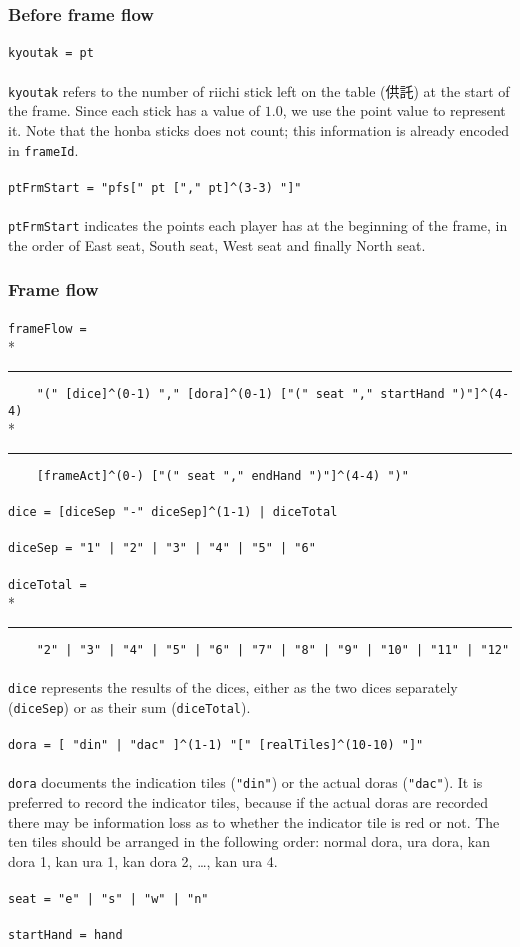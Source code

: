 \documentclass[%
	a4paper%
	,10pt%
	,twoside%
	,notitlepage%
]{article}%
\newcommand*{\ruleSymbol}{\textjapanese{⚠}}%
\newcommand*{\ruleMargin}{\marginpar{\flushright{}\ruleSymbol{}}}%
\newcommand*{\rulePar}{\paragraph*{\ruleMargin{}}}%
\newcommand*{\indentRule}{\rule{10pt}{0pt}}%
\begin{document}
		\subsubsection{Before frame flow}\label{subsubsec:prefrmflow}%
			\rulePar{}\lstinline/kyoutak = pt/%
			\paragraph*{}\lstinline/kyoutak/ refers to the number of riichi stick left on the table (\textjapanese{供託}) at the start of the frame. Since each stick has a value of $1.0$, we use the point value to represent it. Note that the honba sticks does not count; this information is already encoded in \lstinline/frameId/. %
			\rulePar{}\lstinline/ptFrmStart = "pfs[" pt ["," pt]^(3-3) "]"/%
			\paragraph*{}\lstinline/ptFrmStart/ indicates the points each player has at the beginning of the frame, in the order of East seat, South seat, West seat and finally North seat. %
		\subsubsection{Frame flow}\label{subsubsec:frmflow}%
			\rulePar{}\lstinline/frameFlow = /\\*{}%
			\indentRule{}\lstinline/    "(" [dice]^(0-1) "," [dora]^(0-1) ["(" seat "," startHand ")"]^(4-4) /\\*{}%
			\indentRule{}\lstinline/    [frameAct]^(0-) ["(" seat "," endHand ")"]^(4-4) ")"/%
			\rulePar{}\lstinline/dice = [diceSep "-" diceSep]^(1-1) | diceTotal/%
			\rulePar{}\lstinline/diceSep = "1" | "2" | "3" | "4" | "5" | "6"/%
			\rulePar{}\lstinline/diceTotal = /\\*{}%
			\indentRule{}\lstinline/    "2" | "3" | "4" | "5" | "6" | "7" | "8" | "9" | "10" | "11" | "12" /%
			\paragraph*{}\lstinline/dice/ represents the results of the dices, either as the two dices separately (\lstinline/diceSep/) or as their sum (\lstinline/diceTotal/). %
			\rulePar{}\lstinline/dora = [ "din" | "dac" ]^(1-1) "[" [realTiles]^(10-10) "]"/%
			\paragraph*{}\lstinline/dora/ documents the indication tiles (\lstinline/"din"/) or the actual doras (\lstinline/"dac"/). It is preferred to record the indicator tiles, because if the actual doras are recorded there may be information loss as to whether the indicator tile is red or not. The ten tiles should be arranged in the following order: normal dora, ura dora, kan dora 1, kan ura 1, kan dora 2, \dots{}, kan ura 4. %
			\rulePar{}\lstinline/seat = "e" | "s" | "w" | "n"/%
			\rulePar{}\lstinline/startHand = hand/%
\end{document}
